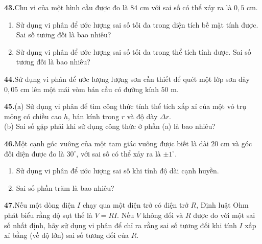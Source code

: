 \begin{minipage}[t]{0.48\textwidth}
  \vspace{1.6ex}
  \noindent\textbf{43.}\enspace Chu vi của một hình cầu được đo là $84\text{ cm}$ với sai số có thể xảy ra là $0{,}5\text{ cm}$.
  \begin{enumerate}[label=(\alph*), leftmargin=1.5em, itemsep=1pt, topsep=2pt, parsep=0pt]
    \item Sử dụng vi phân để ước lượng sai số tối đa trong diện tích bề mặt tính được. Sai số tương đối là bao nhiêu?
    \item Sử dụng vi phân để ước lượng sai số tối đa trong thể tích tính được. Sai số tương đối là bao nhiêu?
  \end{enumerate}

  \vspace{1.6ex}
  \noindent\textbf{44.}\enspace Sử dụng vi phân để ước lượng lượng sơn cần thiết để quét một lớp sơn dày $0{,}05\text{ cm}$ lên một mái vòm bán cầu có đường kính $50\text{ m}$.

  \vspace{1.6ex}
  \noindent\textbf{45.}\enspace (a) Sử dụng vi phân để tìm công thức tính thể tích xấp xỉ của một vỏ trụ mỏng có chiều cao $h$, bán kính trong $r$ và độ dày $\Delta r$. \\
  (b) Sai số gặp phải khi sử dụng công thức ở phần (a) là bao nhiêu?

  \vspace{1.6ex}
  \noindent\textbf{46.}\enspace Một cạnh góc vuông của một tam giác vuông được biết là dài $20\text{ cm}$ và góc đối diện được đo là $30^\circ$, với sai số có thể xảy ra là $\pm 1^\circ$.
  \begin{enumerate}[label=(\alph*), leftmargin=1.5em, itemsep=1pt, topsep=2pt, parsep=0pt]
    \item Sử dụng vi phân để ước lượng sai số khi tính độ dài cạnh huyền.
    \item Sai số phần trăm là bao nhiêu?
  \end{enumerate}

  \vspace{1.6ex}
  \noindent\textbf{47.}\enspace Nếu một dòng điện $I$ chạy qua một điện trở có điện trở $R$, Định luật Ohm phát biểu rằng độ sụt thế là $V = RI$. Nếu $V$ không đổi và $R$ được đo với một sai số nhất định, hãy sử dụng vi phân để chỉ ra rằng sai số tương đối khi tính $I$ xấp xỉ bằng (về độ lớn) sai số tương đối của $R$.
\end{minipage}
